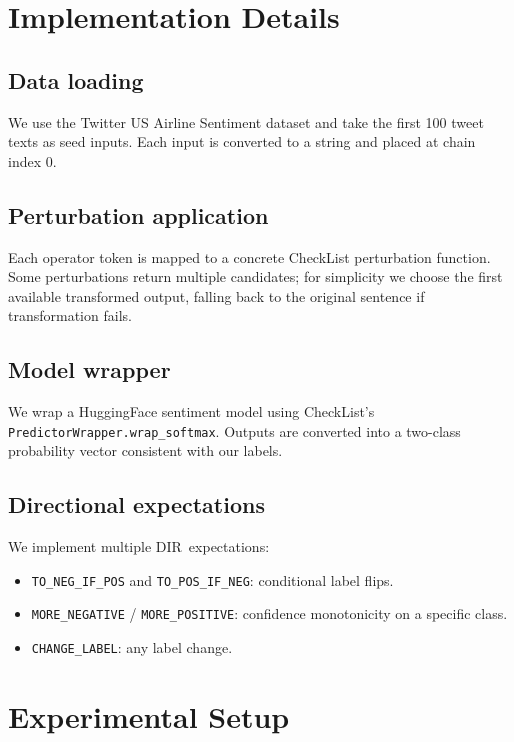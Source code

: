 \documentclass[11pt]{article}
\newcommand{\DIR}{\textsc{DIR}}
\begin{document}
\section{Implementation Details}

\subsection{Data loading}
We use the Twitter US Airline Sentiment dataset and take the first 100 tweet texts as seed inputs. Each input is converted to a string and placed at chain index $0$.

\subsection{Perturbation application}
Each operator token is mapped to a concrete CheckList perturbation function. Some perturbations return multiple candidates; for simplicity we choose the first available transformed output, falling back to the original sentence if transformation fails.

\subsection{Model wrapper}
We wrap a HuggingFace sentiment model using CheckList's \texttt{PredictorWrapper.wrap\_softmax}. Outputs are converted into a two-class probability vector consistent with our labels.

\subsection{Directional expectations}
We implement multiple \DIR\ expectations:
\begin{itemize}
  \item \texttt{TO\_NEG\_IF\_POS} and \texttt{TO\_POS\_IF\_NEG}: conditional label flips.
  \item \texttt{MORE\_NEGATIVE} / \texttt{MORE\_POSITIVE}: confidence monotonicity on a specific class.
  \item \texttt{CHANGE\_LABEL}: any label change.
\end{itemize}

\section{Experimental Setup}
\end{document}
